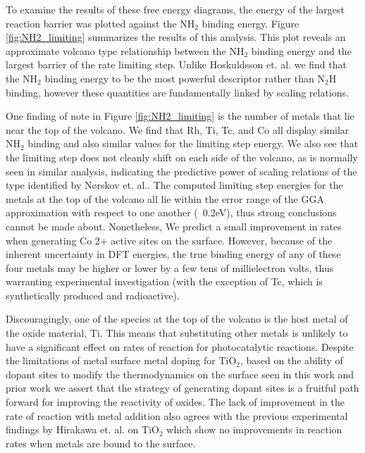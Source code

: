 To examine the results of these free energy diagrams, the energy of the largest reaction barrier was plotted against the NH$_2$ binding energy. Figure \ref{fig:NH2_limiting} summarizes the results of this analysis. This plot reveals an approximate volcano type relationship between the NH$_2$ binding energy and the largest barrier of the rate limiting step. Unlike Hoskuldsson et. al.\cite{Hoskuldsson_2017} we find that the NH$_2$ binding energy to be the most powerful descriptor rather than N$_2$H binding, however these quantities are fundamentally linked by scaling relations.

One finding of note in Figure \ref{fig:NH2_limiting} is the number of metals that lie near the top of the volcano. We find that Rh, Ti, Tc, and Co all display similar NH$_2$ binding and also similar values for the limiting step energy. We also see that the limiting step does not cleanly shift on each side of the volcano, as is normally seen in similar analysis, indicating the predictive power of scaling relations of the type identified by N{\o}rskov et. al.\cite{N_rskov_2004}. The computed limiting step energies for the metals at the top of the volcano all lie within the error range of the GGA approximation with respect to one another (~0.2eV)\cite{}, thus strong conclusions cannot be made about. Nonetheless, We predict a small improvement in rates when generating Co 2+ active sites on the surface. However, because of the inherent uncertainty in DFT energies, the true binding energy of any of these four metals may be higher or lower by a few tens of millielectron volts, thus warranting experimental investigation (with the exception of Tc, which is synthetically produced and radioactive).

Discouragingly, one of the species at the top of the volcano is the host metal of the oxide material, Ti. This means that substituting other metals is unlikely to have a significant effect on rates of reaction for photocatalytic reactions. Despite the limitations of metal surface metal doping for TiO$_2$, based on the ability of dopant sites to modify the thermodynamics on the surface seen in this work and prior work \cite{Xu_2015,Yao_2017} we assert that the strategy of generating dopant sites is a fruitful path forward for improving the reactivity of oxides. The lack of improvement in the rate of reaction with metal addition also agrees with the previous experimental findings by Hirakawa et. al.\cite{Hirakawa_2017} on TiO$_2$ which show no improvements in reaction rates when metals are bound to the surface.


